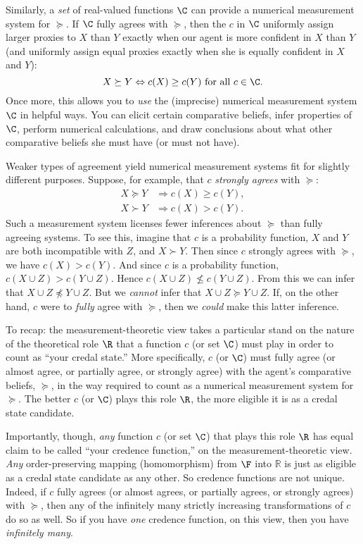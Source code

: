 Similarly, a \textit{set} of real-valued functions $\C$ can provide a numerical measurement system for $\succeq$. If $\C$ fully agrees with $\succeq$, then the $c$ in $\C$ uniformly assign larger proxies to $X$ than $Y$ exactly when our agent is more confident in $X$ than $Y$ (and uniformly assign equal proxies exactly when she is equally confident in $X$ and $Y$): 
$$ X\succeq Y \Leftrightarrow c(X) \geq c(Y) \text{ for all } c\in\C. $$
Once more, this allows you to \textit{use} the (imprecise) numerical measurement system $\C$ in helpful ways. You can elicit certain comparative beliefs, infer properties of $\C$, perform numerical calculations, and draw conclusions about what other comparative beliefs she must have (or must not have).

Weaker types of agreement yield numerical measurement systems fit for slightly different purposes. Suppose, for example, that $c$ \textit{strongly agrees} with $\succeq$:
$$
\begin{aligned}
	X\succeq Y &\Rightarrow c(X)\geq c(Y),\\
	X \succ Y  &\Rightarrow c(X)>c(Y).
\end{aligned}
$$
Such a measurement system licenses fewer inferences about $\succeq$ than fully agreeing systems. To see this, imagine that $c$ is a probability function, $X$ and $Y$ are both incompatible with $Z$, and $X\succ Y$. Then since $c$ strongly agrees with $\succeq$, we have $c(X)>c(Y)$. And since $c$ is a probability function, $c(X\cup Z)>c(Y\cup Z)$. Hence $c(X\cup Z)\not\leq c(Y\cup Z)$. From this we can infer that $X\cup Z \not\preceq Y\cup Z$. But we \textit{cannot} infer that $X\cup Z \succeq Y\cup Z$. If, on the other hand, $c$ were to \textit{fully} agree with $\succeq$, then we \textit{could} make this latter inference.

To recap: the measurement-theoretic view takes a particular stand on the nature of the theoretical role $\R$ that a function $c$ (or set $\C$) must play in order to count as ``your credal state.'' More specifically, $c$ (or $\C$) must fully agree (or almost agree, or partially agree, or strongly agree) with the agent's comparative beliefs, $\succeq$, in the way required to count as a numerical measurement system for $\succeq$. The better $c$ (or $\C$) plays this role $\R$, the more eligible it is as a credal state candidate.

Importantly, though, \textit{any} function $c$ (or set $\C$) that plays this role $\R$ has equal claim to be called ``your credence function,'' on the measurement-theoretic view. \emph{Any} order-preserving mapping (homomorphism) from $\F$ into $\mathbb{R}$ is just as eligible as a credal state candidate as any other. So credence functions are not unique. Indeed, if $c$ fully agrees (or almost agrees, or partially agrees, or strongly agrees) with $\succeq$, then any of the infinitely many strictly increasing transformations of $c$ do so as well. So if you have \emph{one} credence function, on this view, then you have \emph{infinitely many}.

